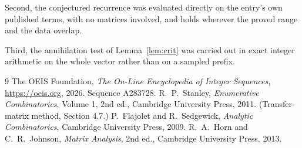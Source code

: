 \documentclass[11pt,a4paper]{article}
\theoremstyle{plain}
\theoremstyle{definition}
\begin{document}
Second, the conjectured recurrence was evaluated directly on the entry's own published terms,
with no matrices involved, and holds wherever the proved range and the data overlap.

Third, the annihilation test of Lemma~\ref{lem:crit} was carried out in exact integer
arithmetic on the whole vector rather than on a sampled prefix.

\begin{thebibliography}{9}
 The OEIS Foundation, \emph{The On-Line Encyclopedia of Integer
Sequences}, \url{https://oeis.org}, 2026. Sequence A283728.
 R.~P.~Stanley, \emph{Enumerative Combinatorics}, Volume 1, 2nd ed.,
Cambridge University Press, 2011. (Transfer-matrix method, Section 4.7.)
 P.~Flajolet and R.~Sedgewick, \emph{Analytic Combinatorics}, Cambridge
University Press, 2009.
 R.~A.~Horn and C.~R.~Johnson, \emph{Matrix Analysis}, 2nd ed., Cambridge
University Press, 2013.
\end{thebibliography}
\end{document}
